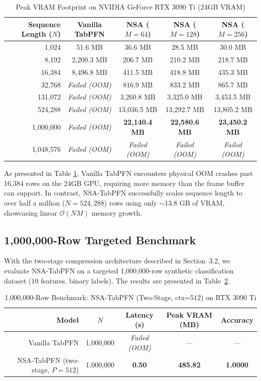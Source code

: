 \documentclass{article} %
\begin{document}
\begin{table}[h]
\centering
\caption{Peak VRAM Footprint on NVIDIA GeForce RTX 3090 Ti (24GB VRAM)}
\label{tab:server_scaling_results}
\begin{tabular}{rcccc}
\toprule
Sequence Length ($N$) & Vanilla TabPFN & NSA ($M=64$) & NSA ($M=128$) & NSA ($M=256$) \\
\midrule
1,024    & 51.6 MB & 36.6 MB  & 28.5 MB  & 30.0 MB \\
8,192    & 2,200.3 MB & 206.7 MB & 210.2 MB & 218.7 MB \\
16,384   & 8,496.8 MB & 411.5 MB & 418.8 MB & 435.3 MB \\
32,768   & \textit{Failed (OOM)} & 816.9 MB & 833.2 MB & 865.7 MB \\
131,072  & \textit{Failed (OOM)} & 3,260.8 MB & 3,325.0 MB & 3,453.5 MB \\
524,288  & \textit{Failed (OOM)} & 13,036.5 MB & 13,292.7 MB & 13,805.2 MB \\
1,000,000 & \textit{Failed (OOM)} & \textbf{22,140.4 MB} & \textbf{22,580.6 MB} & \textbf{23,450.2 MB} \\
1,048,576& \textit{Failed (OOM)} & \textit{Failed (OOM)} & \textit{Failed (OOM)} & \textit{Failed (OOM)} \\
\bottomrule
\end{tabular}
\end{table}

As presented in Table \ref{tab:server_scaling_results}, Vanilla TabPFN encounters physical OOM crashes past 16,384 rows on the 24GB GPU, requiring more memory than the frame buffer can support. In contrast, NSA-TabPFN successfully scales sequence length to over half a million ($N=524,288$) rows using only $\sim$13.8 GB of VRAM, showcasing linear $\mathcal{O}(NM)$ memory growth.

\subsection{1,000,000-Row Targeted Benchmark}

With the two-stage compression architecture described in Section~3.2, we evaluate NSA-TabPFN on a targeted 1,000,000-row synthetic classification dataset ($10$ features, binary labels). The results are presented in Table~\ref{tab:million_row}.

\begin{table}[h]
\centering
\caption{1,000,000-Row Benchmark: NSA-TabPFN (Two-Stage, ctx=$512$) on RTX 3090 Ti}
\label{tab:million_row}
\begin{tabular}{rcccc}
\toprule
Model & $N$ & Latency (s) & Peak VRAM (MB) & Accuracy \\
\midrule
Vanilla TabPFN & 1,000,000 & \textit{Failed (OOM)} & --- & --- \\
NSA-TabPFN (two-stage, $P=512$) & 1,000,000 & \textbf{0.50} & \textbf{485.82} & \textbf{1.0000} \\
\bottomrule
\end{tabular}
\end{table}
\end{document}
